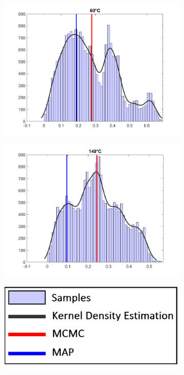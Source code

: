 \begin{figure}

\centering
	\begin{subfigure}[b]{0.45\linewidth}
	\centering
	\includegraphics[width = \linewidth]{figures/histograph/histo1.png}
	\end{subfigure}
	\begin{subfigure}[b]{0.45\linewidth}
	\centering
	\includegraphics[width = \linewidth]{figures/histograph/histo3.png}
	\end{subfigure}
	\centering
	\begin{subfigure}[b]{0.2\linewidth}
	\centering
	\includegraphics[width = \linewidth]{figures/histograph/legend.png}

\end{subfigure}
\end{figure}

